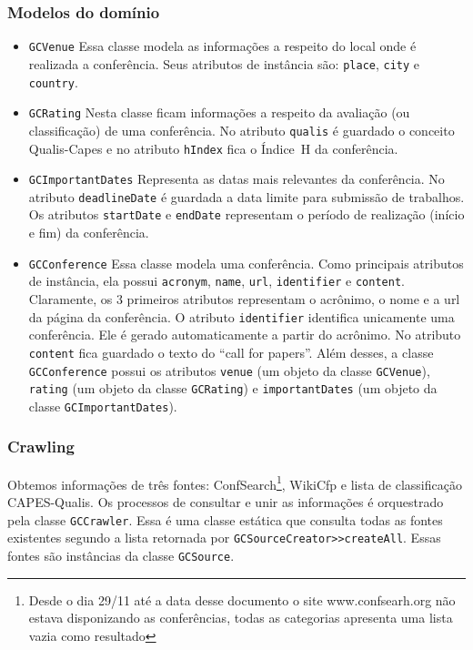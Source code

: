 \subsubsection{Modelos do domínio}
\begin{itemize}
    \item \texttt{GCVenue} Essa classe modela as informações a respeito do local onde é realizada a conferência. Seus atributos de instância são: \texttt{place}, \texttt{city} e  \texttt{country}.
    \item \texttt{GCRating} Nesta classe ficam informações a respeito da avaliação (ou classificação) de uma conferência. No atributo \texttt{qualis} é guardado o conceito Qualis-Capes e no atributo \texttt{hIndex} fica o Índice~H da conferência. 
    \item \texttt{GCImportantDates} Representa as datas mais relevantes da conferência. No atributo \texttt{deadlineDate} é guardada a data limite para submissão de trabalhos. Os atributos \texttt{startDate} e \texttt{endDate} representam o período de realização (início e fim) da conferência.
    \item \texttt{GCConference} Essa classe modela uma conferência. Como principais atributos de instância, ela possui  \texttt{acronym}, \texttt{name}, \texttt{url}, \texttt{identifier} e \texttt{content}. Claramente, os 3 primeiros atributos representam o acrônimo, o nome e a url da página da conferência. O atributo \texttt{identifier} identifica unicamente uma conferência. Ele é gerado automaticamente a partir do acrônimo. No atributo \texttt{content} fica guardado o texto do ``call for papers''.
Além desses, a classe \texttt{GCConference} possui os atributos \texttt{venue} (um objeto da classe \texttt{GCVenue}), \texttt{rating} (um objeto da classe \texttt{GCRating}) e \texttt{importantDates} (um objeto da classe \texttt{GCImportantDates}).
\end{itemize}


\subsubsection{Crawling}%
Obtemos informações de três fontes: ConfSearch\footnote{Desde o dia 29/11 até a data desse documento o site www.confsearh.org não estava disponizando as conferências, todas as categorias
apresenta uma lista vazia como resultado}, WikiCfp e lista de classificação CAPES-Qualis. 
Os processos de consultar e unir as informações é orquestrado pela classe \texttt{GCCrawler}. 
Essa é uma classe estática que consulta todas as fontes existentes segundo a lista retornada por \texttt{GCSourceCreator>>createAll}. 
Essas fontes são instâncias da classe \texttt{GCSource}. 

